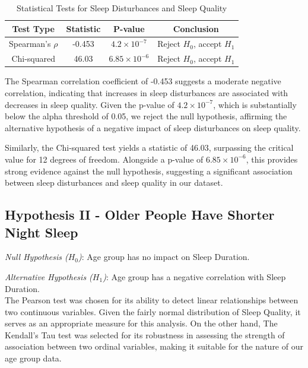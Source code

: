 \documentclass[conference]{IEEEtran}
\begin{document}
      \begin{table}[ht]
      \centering
      \caption{Statistical Tests for Sleep Disturbances and Sleep Quality}
      \label{tab:hypothesis1}
      \begin{tabular}{|c|c|c|c|}
      \hline
      \textbf{Test Type} & \textbf{Statistic} & \textbf{P-value} & \textbf{Conclusion} \\
      \hline
      Spearman's \(\rho\) & -0.453 & \(4.2 \times 10^{-7}\) & Reject \(H_0\), accept \(H_1\)
      \\
      \hline
      Chi-squared & 46.03 & \(6.85 \times 10^{-6}\) & Reject \(H_0\), accept \(H_1\)
      \\
      \hline
      \end{tabular}
      \end{table}
      
      The Spearman correlation coefficient of -0.453 suggests a moderate negative correlation, indicating that increases in sleep disturbances are associated with decreases in sleep quality. Given the p-value of \(4.2 \times 10^{-7}\), which is substantially below the alpha threshold of 0.05, we reject the null hypothesis, affirming the alternative hypothesis of a negative impact of sleep disturbances on sleep quality.
      
      Similarly, the Chi-squared test yields a statistic of 46.03, surpassing the critical value for 12 degrees of freedom. Alongside a p-value of \(6.85 \times 10^{-6}\), this provides strong evidence against the null hypothesis, suggesting a significant association between sleep disturbances and sleep quality in our dataset.
      \subsection*{Hypothesis II - Older People Have Shorter Night Sleep}
\textit{Null Hypothesis (\(H_0\))}: Age group has no impact on Sleep Duration.

\textit{Alternative Hypothesis (\(H_1\))}: Age group has a negative correlation with Sleep Duration.\\
The Pearson test was chosen for its ability to detect linear relationships between two continuous variables. Given the fairly normal distribution of Sleep Quality, it serves as an appropriate measure for this analysis. On the other hand, The Kendall’s Tau test was selected for its robustness in assessing the strength of association between two ordinal variables, making it suitable for the nature of our age group data.
\end{document}
